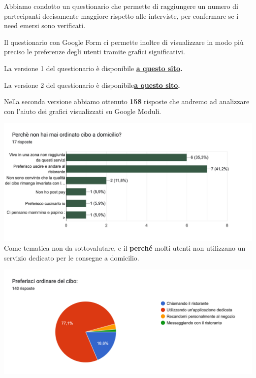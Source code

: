 \documentclass{article}
\begin{document}
    \vspace{2cm} \par 
    \vspace{0.5cm}
\par Abbiamo condotto un questionario che permette di raggiungere un numero di partecipanti decisamente maggiore rispetto alle interviste, per confermare se i need emersi sono verificati.\par Il questionario con Google Form ci permette inoltre di visualizzare in modo più preciso le preferenze degli utenti tramite grafici significativi.
\par La versione 1 del questionario è disponibile \textbf{\href{https://forms.gle/pBWCBfAxsjULCZRj6}{a questo sito}.}
\par La versione 2 del questionario è disponibile\textbf{\href{https://forms.gle/5YYE4SGLwTo8TRMq6}{a questo sito}.}
\par \vspace{1cm}
Nella seconda versione abbiamo ottenuto \textbf{158} risposte che andremo ad analizzare con l'aiuto dei grafici visualizzati su Google Moduli.
\vspace{0.5cm}
\par 
\includegraphics[width=\textwidth]{Data/Grafici/Perche_non_ordina.png}
Come tematica non da sottovalutare, e il \textbf{perché} molti utenti non utilizzano un servizio dedicato per le consegne a domicilio.\vspace{1cm}\par
\includegraphics[width=\textwidth]{Data/Grafici/ordinare_cibo.png}\par
\end{document}
